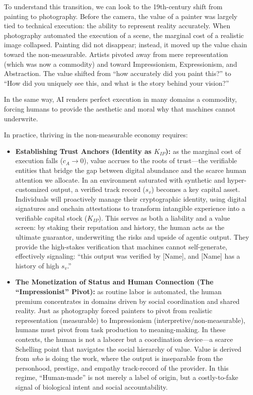 \documentclass[12pt, letter]{article}
\begin{document}
\begin{enumerate}
To understand this transition, we can look to the 19th-century shift from painting to photography. Before the camera, the value of a painter was largely tied to technical execution: the ability to represent reality accurately. When photography automated the execution of a scene, the marginal cost of a realistic image collapsed. Painting did not disappear; instead, it moved up the value chain toward the non-measurable. Artists pivoted away from mere representation (which was now a commodity) and toward Impressionism, Expressionism, and Abstraction. The value shifted from ``how accurately did you paint this?'' to ``How did you uniquely see this, and what is the story behind your vision?''

In the same way, AI renders perfect execution in many domains a commodity, forcing humans to provide the aesthetic and moral why that machines cannot underwrite.

In practice, thriving in the non-measurable economy requires:

\begin{itemize}
    \item \textbf{Establishing Trust Anchors (Identity as $K_{IP}$):} as the marginal cost of execution falls ($c_A \to 0$), value accrues to the roots of trust—the verifiable entities that bridge the gap between digital abundance and the scarce human attention we allocate. In an environment saturated with synthetic and hyper-customized output, a verified track record ($s_v$) becomes a key capital asset. Individuals will proactively manage their cryptographic identity, using digital signatures and onchain attestations to transform intangible experience into a verifiable capital stock ($K_{IP}$). This serves as both a liability and a value screen: by staking their reputation and history, the human acts as the ultimate guarantor, underwriting the risks and upside of agentic output. They provide the high-stakes verification that machines cannot self-generate, effectively signaling: ``this output was verified by [Name], and [Name] has a history of high $s_v$.''

    \item \textbf{The Monetization of Status and Human Connection (The ``Impressionist'' Pivot):} as routine labor is automated, the human premium concentrates in domains driven by social coordination and shared reality. Just as photography forced painters to pivot from realistic representation (measurable) to Impressionism (interpretive/non-measurable), humans must pivot from task production to meaning-making. In these contexts, the human is not a laborer but a coordination device—a scarce Schelling point that navigates the social hierarchy of value. Value is derived from \textit{who} is doing the work, where the output is inseparable from the personhood, prestige, and empathy track-record of the provider. In this regime, ``Human-made'' is not merely a label of origin, but a costly-to-fake signal of biological intent and social accountability.

\end{itemize}
    
\end{enumerate}
\end{document}
